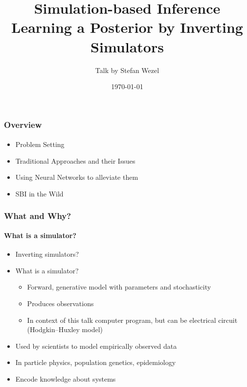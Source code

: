 \documentclass[9pt, aspectratio=169]{beamer}
\title{Simulation-based Inference \\
	\small Learning a Posterior by Inverting Simulators}
\author{Talk by Stefan Wezel}
\institute{mlcolab @ Tübingen University}
\date{\today}
\begin{document}
	

\begin{frame}[plain]
	\titlepage
\end{frame} 



\begin{frame}
\frametitle{Overview}
\framesubtitle{}
\begin{itemize}
	\item Problem Setting %
	\item Traditional Approaches and their Issues
	\item Using Neural Networks to alleviate them
	\item SBI in the Wild
\end{itemize}
\end{frame} 






\begin{frame}
\frametitle{What and Why?}
\framesubtitle{What is a simulator?}
\begin{itemize}
	\item Inverting simulators?%
	\item What is a simulator? %
	\begin{itemize}
		\item Forward, generative model with parameters and stochasticity
		\item Produces observations
		\item In context of this talk computer program, but can be electrical circuit (Hodgkin–Huxley model)
	\end{itemize}
	\item Used by scientists to model empirically observed data
	\item In particle physics, population genetics, epidemiology
	\item Encode knowledge about systems
\end{itemize}
\end{frame} 
\end{document}
